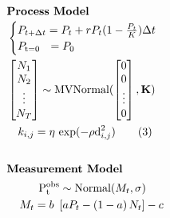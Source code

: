 \documentclass[12pt,preview,border=0]{standalone}
\begin{document}
\begin{align*} 
    \intertext{\centering \textbf{Process Model}}
    &\begin{cases}
        P_{t + \Delta t} = P_t + r P_t (1 - \frac{P_t}{K}) \Delta t \\
        P_\text{t=0}  ~~ = P_0 \\
    \end{cases} 
    \\
    &\begin{bmatrix}
        N_1 \\
        N_2 \\
        \vdots \\
        N_T
    \end{bmatrix} \sim \text{MVNormal}( 
        \begin{bmatrix}
            0 \\
            0 \\
            \vdots \\
            0
        \end{bmatrix}, 
    \textbf{K} ) 
    \\
    & ~~~ k_{i,j} = \eta ~ \text{exp}( -\rho \text{d}^\text{2}_{i,j} ) \label{eq:dgp} \tag{3} \\
    \\
    \intertext{\centering \textbf{Measurement Model}}
    & \hphantom{xxxxx} \mathrm{ P_{t}^{obs} }  \sim \text{Normal}( M_t, \sigma )  \\
    & \hphantom{xx} M_t                     =  b ~ \left[ a P_t - \left( 1 - a \right) N_t \right] - c 
\end{align*}
\end{document}

